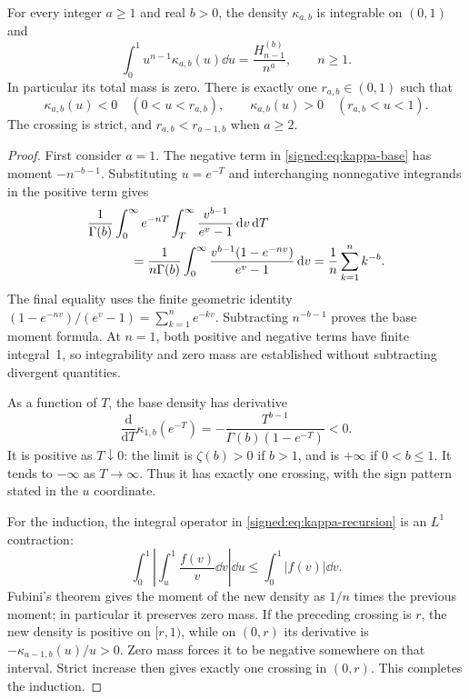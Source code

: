 \begin{theorem}\label{signed:thm:kernel}
For every integer $a\ge1$ and real $b>0$, the density $\kappa_{a,b}$ is integrable on $(0,1)$ and
\begin{equation}\label{signed:eq:kernel-moments}
 \int_0^1u^{n-1}\kappa_{a,b}(u)\dd u
 =\frac{H_{n-1}^{(b)}}{n^a},\qquad n\ge1.
\end{equation}
In particular its total mass is zero. There is exactly one $r_{a,b}\in(0,1)$ such that
\begin{equation}\label{signed:eq:kernel-sign}
 \kappa_{a,b}(u)<0\quad(0<u<r_{a,b}),\qquad
 \kappa_{a,b}(u)>0\quad(r_{a,b}<u<1).
\end{equation}
The crossing is strict, and $r_{a,b}<r_{a-1,b}$ when $a\ge2$.
\end{theorem}
\begin{proof}
First consider $a=1$. The negative term in \eqref{signed:eq:kappa-base} has moment $-n^{-b-1}$. Substituting $u=e^{-T}$ and interchanging nonnegative integrands in the positive term gives
\begin{align*}
 &\frac1{\Gamma(b)}\int_0^\infty e^{-nT}
       \int_T^\infty\frac{v^{b-1}}{e^v-1}\dd v\dd T\\
 &\hspace{12mm}=\frac1{n\Gamma(b)}\int_0^\infty
       \frac{v^{b-1}(1-e^{-nv})}{e^v-1}\dd v
 =\frac1n\sum_{k=1}^n k^{-b}.
\end{align*}
The final equality uses the finite geometric identity
$(1-e^{-nv})/(e^v-1)=\sum_{k=1}^n e^{-kv}$.
Subtracting $n^{-b-1}$ proves the base moment formula. At $n=1$, both positive and negative terms have finite integral~1, so integrability and zero mass are established without subtracting divergent quantities.

As a function of $T$, the base density has derivative
\begin{equation}\label{signed:eq:kappa-base-derivative}
 \frac{\mathrm d}{\mathrm dT}\kappa_{1,b}(e^{-T})
 =-\frac{T^{b-1}}{\Gamma(b)(1-e^{-T})}<0.
\end{equation}
It is positive as $T\downarrow0$: the limit is $\zeta(b)>0$ if $b>1$, and is $+\infty$ if $0<b\le1$. It tends to $-\infty$ as $T\to\infty$. Thus it has exactly one crossing, with the sign pattern stated in the $u$ coordinate.

For the induction, the integral operator in \eqref{signed:eq:kappa-recursion} is an $L^1$ contraction:
\[
 \int_0^1\left|\int_u^1\frac{f(v)}v\dd v\right|\dd u
 \le\int_0^1|f(v)|\dd v.
\]
Fubini's theorem gives the moment of the new density as $1/n$ times the previous moment; in particular it preserves zero mass. If the preceding crossing is $r$, the new density is positive on $[r,1)$, while on $(0,r)$ its derivative is $-\kappa_{a-1,b}(u)/u>0$. Zero mass forces it to be negative somewhere on that interval. Strict increase then gives exactly one crossing in $(0,r)$. This completes the induction.
\end{proof}

